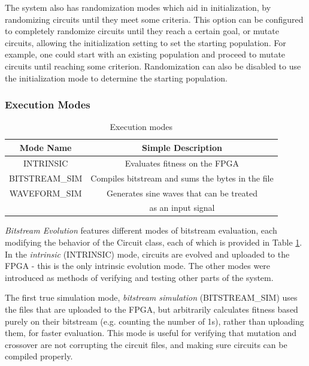 \documentclass{ieeeaccess}
\begin{document}
The system also has randomization modes which aid in initialization, by randomizing circuits until they meet some criteria. 
This option can be configured to completely randomize circuits until they reach a certain goal, or mutate circuits, allowing the initialization setting to set the starting population. For example, one could start with an existing population and proceed to mutate circuits until reaching some criterion. Randomization can also be disabled to use the initialization mode to determine the starting population.



\subsubsection{Execution Modes}

\begin{table}[!ht]
\caption{Execution modes\label{tab:table_execmodes}}
\centering
\begin{tabular}{|c|c|}
\hline
\textbf{Mode Name} & \textbf{Simple Description}\\
\hline
INTRINSIC & Evaluates fitness on the FPGA \\
\hline
BITSTREAM\_SIM & Compiles bitstream and sums the bytes in the file \\
\hline
WAVEFORM\_SIM & Generates sine waves that can be treated\\&as an input signal \\
\hline
\end{tabular}
\end{table}


\textit{Bitstream Evolution} features different modes of bitstream evaluation, each 
modifying the behavior of the Circuit class, each of which is provided in Table \ref{tab:table_execmodes}.
In the \textit{intrinsic} (INTRINSIC) mode, circuits are evolved and uploaded to the FPGA - this is the only intrinsic evolution mode. The other modes were introduced as methods of verifying and testing other parts of the system. 

The first true simulation mode, \textit{bitstream simulation} (BITSTREAM\_SIM) uses the files that are uploaded to the FPGA, but arbitrarily calculates fitness based purely on their bitstream (e.g. counting the number of 1s), rather than uploading them, for faster evaluation. This mode is useful for verifying that mutation and crossover are not corrupting the circuit files, and making sure circuits can be compiled properly. 
\end{document}
